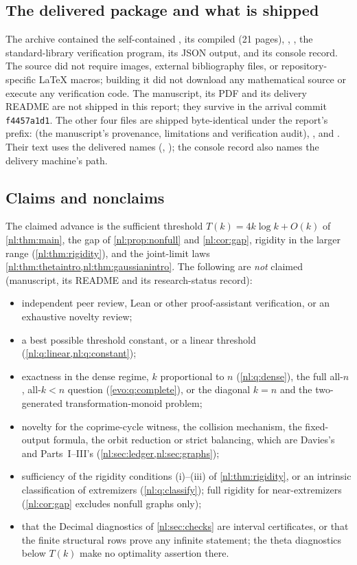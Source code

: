 \documentclass[11pt,a4paper]{article}
\numberwithin{equation}{section}
\theoremstyle{definition}
\theoremstyle{remark}
\begin{document}
\subsection{The delivered package and what is shipped}
The archive contained the self-contained , its compiled
 (21 pages), , ,
the standard-library verification program, its JSON output, and its
console record. The source did not require images, external bibliography
files, or repository-specific LaTeX macros; building it did not download
any mathematical source or execute any verification code. The manuscript,
its PDF and its delivery README are not shipped in this report; they
survive in the arrival commit \texttt{f4457a1d1}. The other four files are
shipped byte-identical under the report's prefix:
 (the manuscript's provenance,
limitations and verification audit), ,
 and
. Their text uses the delivered names
(, ); the console record
also names the delivery machine's path.

\subsection{Claims and nonclaims}
The claimed advance is the sufficient threshold $T(k)=4k\log k+O(k)$ of
\cref{nl:thm:main}, the gap of \cref{nl:prop:nonfull} and
\cref{nl:cor:gap}, rigidity in the larger range (\cref{nl:thm:rigidity}),
and the joint-limit laws \cref{nl:thm:thetaintro,nl:thm:gaussianintro}.
The following are \emph{not} claimed (manuscript, its README and its
research-status record):
\begin{itemize}
\item independent peer review, Lean or other proof-assistant verification,
 or an exhaustive novelty review;
\item a best possible threshold constant, or a linear threshold
 (\cref{nl:q:linear,nl:q:constant});
\item exactness in the dense regime, $k$ proportional to $n$
 (\cref{nl:q:dense}), the full all-$n$, all-$k<n$ question
 (\cref{evo:q:complete}), or the diagonal $k=n$ and the two-generated
 transformation-monoid problem;
\item novelty for the coprime-cycle witness, the collision mechanism, the
 fixed-output formula, the orbit reduction or strict balancing, which are
 Davies's and Parts~I--III's (\cref{nl:sec:ledger,nl:sec:graphs});
\item sufficiency of the rigidity conditions (i)--(iii) of
 \cref{nl:thm:rigidity}, or an intrinsic classification of extremizers
 (\cref{nl:q:classify}); full rigidity for near-extremizers
 (\cref{nl:cor:gap} excludes nonfull graphs only);
\item that the Decimal diagnostics of \cref{nl:sec:checks} are interval
 certificates, or that the finite structural rows prove any infinite
 statement; the theta diagnostics below $T(k)$ make no optimality
 assertion there.
\end{itemize}
\end{document}
